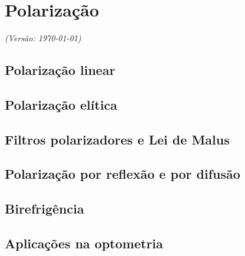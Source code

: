 \chapter{Polarização}
\textsl{{\sffamily(Versão: \today)}}

\section{Polarização linear}
\tobedone{}
\section{Polarização elítica}
\tobedone{}
\section{Filtros polarizadores e Lei de Malus}
\tobedone{}
\section{Polarização por reflexão e por difusão}
\tobedone{}
\section{Birefrigência}
\tobedone{}
\section{Aplicações na optometria}
\tobedone{}
